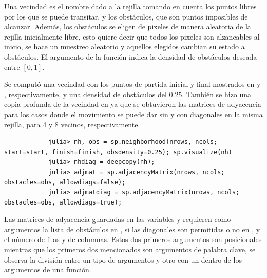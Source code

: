 \begin{enumerate}
\begin{solution}
        Una vecindad es el nombre dado a la rejilla tomando en cuenta los puntos libres por los que se puede transitar, y los obstáculos, que son puntos imposibles de alcanzar. Además, los obstáculos se eligen de pixeles de manera aleatoria de la rejilla inicialmente libre, esto quiere decir que todos los pixeles son alzancables al inicio, se hace un muestreo aleatorio y aquellos elegidos cambian su estado a obstáculos. El argumento  de la función  indica la densidad de obstáculos deseada entre $[0, 1]$. 

        Se computó una vecindad con los puntos de partida inicial y final mostrados en  y , respectivamente, y una densidad de obstáculos del $0.25$. También se hizo una copia profunda de la vecindad  en  ya que se obtuvieron las matrices de adyacencia para los casos donde el movimiento se puede dar sin y con diagonales en la misma rejilla, para 4 y 8 vecinos, respectivamente.
        \begin{verbatim}
            julia> nh, obs = sp.neighborhood(nrows, ncols; start=start, finish=finish, obsdensity=0.25); sp.visualize(nh)
            julia> nhdiag = deepcopy(nh);
            julia> adjmat = sp.adjacencyMatrix(nrows, ncols; obstacles=obs, allowdiags=false);
            julia> adjmatdiag = sp.adjacencyMatrix(nrows, ncols; obstacles=obs, allowdiags=true);
        \end{verbatim}

        Las matrices de adyacencia guardadas en las variables  y  requieren como argumentos la lista de obstáculos en , si las diagonales son permitidas o no en , y el número de filas y de columnas. Estos dos primeros argumentos son posicionales mientras que los primeros dos mencionados son argumentos de palabra clave, se observa la división entre un tipo de argumentos y otro con un \code{;} dentro de los argumentos de una función.


\end{solution}
\end{enumerate}
